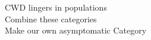 \documentclass[preview]{standalone}
\begin{document}
\begin{center}
CWD lingers in populations\\Combine these categories\\Make our own asymptomatic Category
\end{center}
\end{document}
